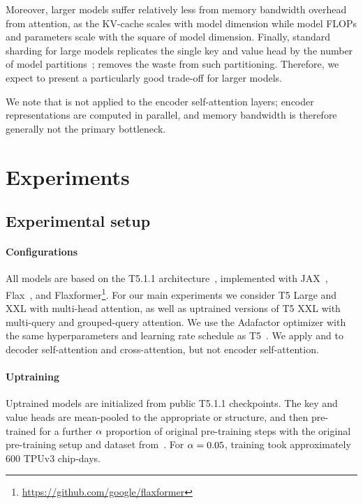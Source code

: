 \documentclass[11pt]{article}
\begin{document}
Moreover, larger models suffer relatively less from memory bandwidth overhead from attention, as the KV-cache scales with model dimension while model FLOPs and parameters scale with the square of model dimension. Finally, standard sharding for large models replicates the single key and value head by the number of model partitions~\citep{palminference}; \gmq removes the waste from such partitioning. Therefore, we expect \gmq to present a particularly good trade-off for larger models. 

We note that \gmq is not applied to the encoder self-attention layers; encoder representations are computed in parallel, and memory bandwidth is therefore generally not the primary bottleneck.

\section{Experiments}
\label{section:experiments}

\subsection{Experimental setup}

\paragraph{Configurations}
All models are based on the T5.1.1 architecture~\citep{t5}, implemented with JAX~\citep{jax}, Flax~\citep{flax}, and Flaxformer\footnote{\url{https://github.com/google/flaxformer}}. For our main experiments we consider T5 Large and XXL with multi-head attention, as well as uptrained versions of T5 XXL with multi-query and grouped-query attention. We use the Adafactor optimizer with the same hyperparameters and learning rate schedule as T5~\citep{t5}. We apply \mq and \gmq to decoder self-attention and cross-attention, but not encoder self-attention.

\paragraph{Uptraining}

Uptrained models are initialized from public T5.1.1 checkpoints. The key and value heads are mean-pooled to the appropriate \mq or \gmq structure, and then pre-trained for a further 
$\alpha$ proportion of original pre-training steps with the original pre-training setup and dataset from~\citep{t5}. For $\alpha=0.05$, training took approximately 600 TPUv3 chip-days.
\end{document}
